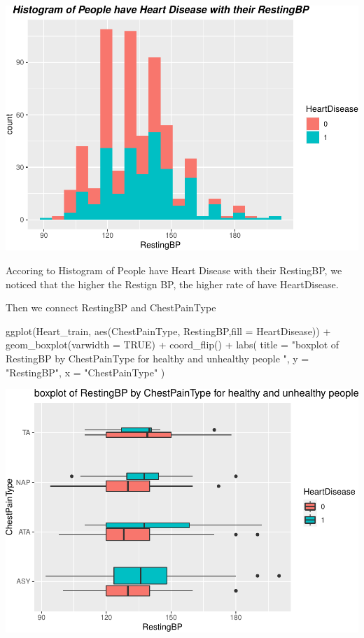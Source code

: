 \documentclass[
]{article}
\newenvironment{Shaded}{\begin{snugshade}}{\end{snugshade}}
\newcommand{\AttributeTok}[1]{\textcolor[rgb]{0.77,0.63,0.00}{#1}}
\newcommand{\ConstantTok}[1]{\textcolor[rgb]{0.00,0.00,0.00}{#1}}
\newcommand{\FunctionTok}[1]{\textcolor[rgb]{0.00,0.00,0.00}{#1}}
\newcommand{\NormalTok}[1]{#1}
\newcommand{\SpecialCharTok}[1]{\textcolor[rgb]{0.00,0.00,0.00}{#1}}
\newcommand{\StringTok}[1]{\textcolor[rgb]{0.31,0.60,0.02}{#1}}
\begin{document}
\includegraphics{PSTAT-131--FINAL-PROJECT-_YIFAN-XU_files/figure-latex/unnamed-chunk-10-1.pdf}

Accoring to Histogram of People have Heart Disease with their RestingBP,
we noticed that the higher the Restign BP, the higher rate of have
HeartDisease.

Then we connect RestingBP and ChestPainType

\begin{Shaded}
\begin{Highlighting}[]
\FunctionTok{ggplot}\NormalTok{(Heart\_train, }\FunctionTok{aes}\NormalTok{(ChestPainType, RestingBP,}\AttributeTok{fill =}\NormalTok{ HeartDisease)) }\SpecialCharTok{+}
  \FunctionTok{geom\_boxplot}\NormalTok{(}\AttributeTok{varwidth =} \ConstantTok{TRUE}\NormalTok{) }\SpecialCharTok{+} 
  \FunctionTok{coord\_flip}\NormalTok{() }\SpecialCharTok{+}
  \FunctionTok{labs}\NormalTok{(}
    \AttributeTok{title =} \StringTok{"boxplot of RestingBP by ChestPainType for healthy and unhealthy people "}\NormalTok{,}
    \AttributeTok{y =} \StringTok{"RestingBP"}\NormalTok{,}
    \AttributeTok{x =} \StringTok{"ChestPainType"}
\NormalTok{  )}
\end{Highlighting}
\end{Shaded}

\includegraphics{PSTAT-131--FINAL-PROJECT-_YIFAN-XU_files/figure-latex/unnamed-chunk-11-1.pdf}
\end{document}
